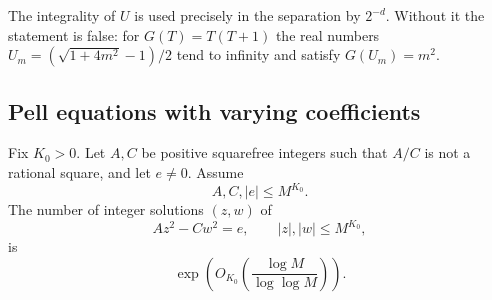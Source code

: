 The integrality of $U$ is used precisely in the separation by $2^{-d}$.
Without it the statement is false: for $G(T)=T(T+1)$ the real numbers
$U_m=(\sqrt{1+4m^2}-1)/2$ tend to infinity and satisfy $G(U_m)=m^2$.

\subsection{Pell equations with varying coefficients}
\begin{lemma}\label{supp:lem:pell}
Fix $K_0>0$. Let $A,C$ be positive squarefree integers such that $A/C$ is not a rational square, and let $e\ne0$. Assume
\[
 A,C,|e|\le M^{K_0}.
\]
The number of integer solutions $(z,w)$ of
\[
 Az^2-Cw^2=e,
 \qquad
 |z|,|w|\le M^{K_0},
\]
is
\begin{equation}\label{supp:eq:pell-uniform}
 \exp\!\left(O_{K_0}\!\left(\frac{\log M}{\log\log M}\right)\right).
\end{equation}
\end{lemma}

